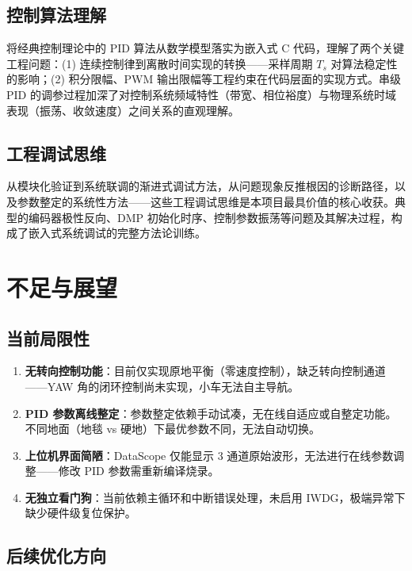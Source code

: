 \documentclass[12pt,a4paper,UTF8]{ctexrep}
\begin{document}
\subsection{控制算法理解}

将经典控制理论中的 PID 算法从数学模型落实为嵌入式 C 代码，理解了两个关键工程问题：(1) 连续控制律到离散时间实现的转换——采样周期 $T_s$ 对算法稳定性的影响；(2) 积分限幅、PWM 输出限幅等工程约束在代码层面的实现方式。串级 PID 的调参过程加深了对控制系统频域特性（带宽、相位裕度）与物理系统时域表现（振荡、收敛速度）之间关系的直观理解。

\subsection{工程调试思维}

从模块化验证到系统联调的渐进式调试方法，从问题现象反推根因的诊断路径，以及参数整定的系统性方法——这些工程调试思维是本项目最具价值的核心收获。典型的编码器极性反向、DMP 初始化时序、控制参数振荡等问题及其解决过程，构成了嵌入式系统调试的完整方法论训练。

\section{不足与展望}

\subsection{当前局限性}

\begin{enumerate}
  \item \textbf{无转向控制功能}：目前仅实现原地平衡（零速度控制），缺乏转向控制通道——YAW 角的闭环控制尚未实现，小车无法自主导航。
  \item \textbf{PID 参数离线整定}：参数整定依赖手动试凑，无在线自适应或自整定功能。不同地面（地毯 vs 硬地）下最优参数不同，无法自动切换。
  \item \textbf{上位机界面简陋}：DataScope 仅能显示 3 通道原始波形，无法进行在线参数调整——修改 PID 参数需重新编译烧录。
  \item \textbf{无独立看门狗}：当前依赖主循环和中断错误处理，未启用 IWDG，极端异常下缺少硬件级复位保护。
\end{enumerate}

\subsection{后续优化方向}
\end{document}
